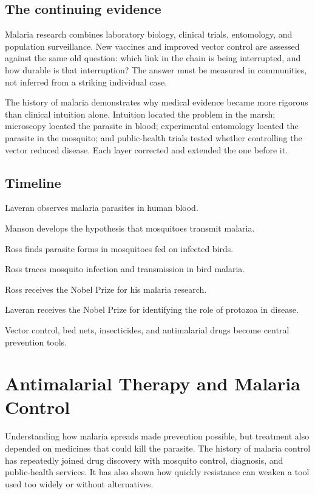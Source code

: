 \documentclass[12pt,oneside]{book}
\begin{document}
\section{The continuing evidence}
Malaria research combines laboratory biology, clinical trials, entomology, and
population surveillance. New vaccines and improved vector control are assessed
against the same old question: which link in the chain is being interrupted,
and how durable is that interruption? The answer must be measured in
communities, not inferred from a striking individual case.

The history of malaria demonstrates why medical evidence became more rigorous
than clinical intuition alone. Intuition located the problem in the marsh;
microscopy located the parasite in blood; experimental entomology located the
parasite in the mosquito; and public-health trials tested whether controlling
the vector reduced disease. Each layer corrected and extended the one before it.

\section*{Timeline}
\begin{description}[leftmargin=2.3cm,style=nextline]
  \item[1880] Laveran observes malaria parasites in human blood.
  \item[1894--1896] Manson develops the hypothesis that mosquitoes transmit malaria.
  \item[1897] Ross finds parasite forms in mosquitoes fed on infected birds.
  \item[1898--1899] Ross traces mosquito infection and transmission in bird malaria.
  \item[1902] Ross receives the Nobel Prize for his malaria research.
  \item[1907] Laveran receives the Nobel Prize for identifying the role of protozoa in disease.
  \item[Twentieth century] Vector control, bed nets, insecticides, and antimalarial drugs become central prevention tools.
\end{description}
\chapter[Antimalarial Therapy and Malaria Control]{Antimalarial Therapy and Malaria Control}

Understanding how malaria spreads made prevention possible, but treatment
also depended on medicines that could kill the parasite. The history of
malaria control has repeatedly joined drug discovery with mosquito control,
diagnosis, and public-health services. It has also shown how quickly
resistance can weaken a tool used too widely or without alternatives.
\end{document}
